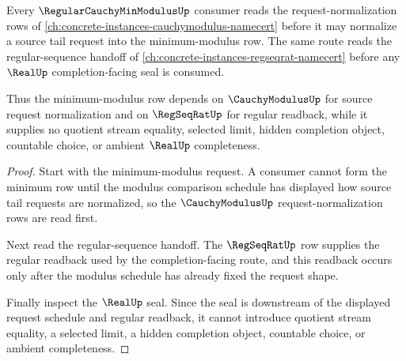 \begin{theorem}
\label{thm:regular-cauchy-min-modulus-cauchy-modulus-dependency}
Every $\RegularCauchyMinModulusUp$ consumer reads the request-normalization rows of \autoref{ch:concrete-instances-cauchymodulus-namecert} before it may normalize a source tail request into the minimum-modulus row. The same route reads the regular-sequence handoff of \autoref{ch:concrete-instances-regseqrat-namecert} before any $\RealUp$ completion-facing seal is consumed.

Thus the minimum-modulus row depends on $\CauchyModulusUp$ for source request normalization and on $\RegSeqRatUp$ for regular readback, while it supplies no quotient stream equality, selected limit, hidden completion object, countable choice, or ambient $\RealUp$ completeness.
\end{theorem}
\begin{proof}
Start with the minimum-modulus request. A consumer cannot form the minimum row until the modulus comparison schedule has displayed how source tail requests are normalized, so the $\CauchyModulusUp$ request-normalization rows are read first.

Next read the regular-sequence handoff. The $\RegSeqRatUp$ row supplies the regular readback used by the completion-facing route, and this readback occurs only after the modulus schedule has already fixed the request shape.

Finally inspect the $\RealUp$ seal. Since the seal is downstream of the displayed request schedule and regular readback, it cannot introduce quotient stream equality, a selected limit, a hidden completion object, countable choice, or ambient completeness.
\end{proof}
